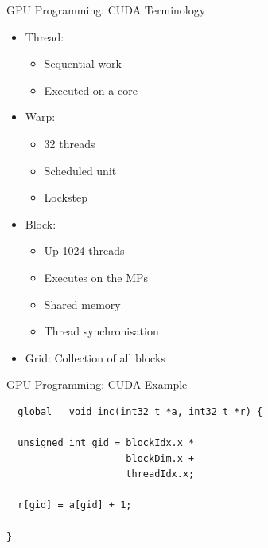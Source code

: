 \documentclass[xcolor=dvipsnames]{beamer}
\begin{document}
\begin{frame}{GPU Programming: CUDA Terminology} 
  
  \begin{itemize} 
    \item Thread:
      \begin{itemize} 
        \item Sequential work
        \item Executed on a core
      \end{itemize}
    \item Warp:
      \begin{itemize} 
        \item 32 threads
        \item Scheduled unit
        \item Lockstep
      \end{itemize}
    \item Block: 
      \begin{itemize} 
        \item Up 1024 threads 
        \item Executes on the MPs
        \item Shared memory 
        \item Thread synchronisation
      \end{itemize} 
    \item Grid: Collection of all blocks
  \end{itemize} 

\end{frame}


%
\begin{frame}[fragile]{GPU Programming: CUDA Example}

\begin{block}{}
\begin{verbatim} 
__global__ void inc(int32_t *a, int32_t *r) {
  
  unsigned int gid = blockIdx.x * 
                     blockDim.x + 
                     threadIdx.x;

  r[gid] = a[gid] + 1; 

} 
\end{verbatim}
\end{block} 


\end{frame} 

%
\end{document}
